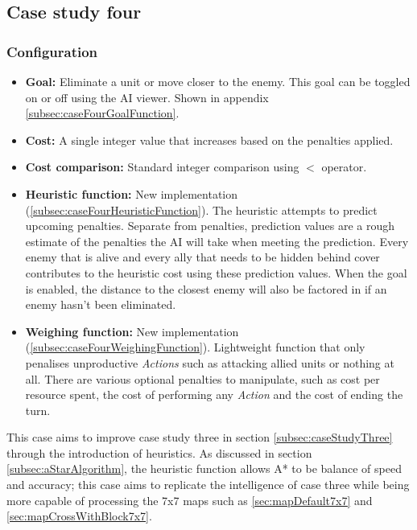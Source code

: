 \documentclass[11pt, a4paper]{report}
\begin{document}
\subsection{Case study four}
\label{subsec:caseStudyFour}

\subsubsection{Configuration}

\begin{itemize}
  \item \textbf{Goal:} Eliminate a unit or move closer to the enemy. This goal can be toggled on or off using the AI viewer. Shown in appendix \ref{subsec:caseFourGoalFunction}.
  \item \textbf{Cost:} A single integer value that increases based on the penalties applied.
  \item \textbf{Cost comparison:} Standard integer comparison using $<$ operator.
  \item \textbf{Heuristic function:} New implementation (\ref{subsec:caseFourHeuristicFunction}). The heuristic attempts to predict upcoming penalties. Separate from penalties, prediction values are a rough estimate of the penalties the AI will take when meeting the prediction. Every enemy that is alive and every ally that needs to be hidden behind cover contributes to the heuristic cost using these prediction values. When the goal is enabled, the distance to the closest enemy will also be factored in if an enemy hasn't been eliminated.
  \item \textbf{Weighing function:} New implementation (\ref{subsec:caseFourWeighingFunction}). Lightweight function that only penalises unproductive \emph{Actions} such as attacking allied units or nothing at all. There are various optional penalties to manipulate, such as cost per resource spent, the cost of performing any \emph{Action} and the cost of ending the turn.
\end{itemize}

This case aims to improve case study three in section \ref{subsec:caseStudyThree} through the introduction of heuristics. As discussed in section \ref{subsec:aStarAlgorithm}, the heuristic function allows A* to be balance of speed and accuracy; this case aims to replicate the intelligence of case three while being more capable of processing the 7x7 maps such as \ref{sec:mapDefault7x7} and \ref{sec:mapCrossWithBlock7x7}. 
\end{document}
